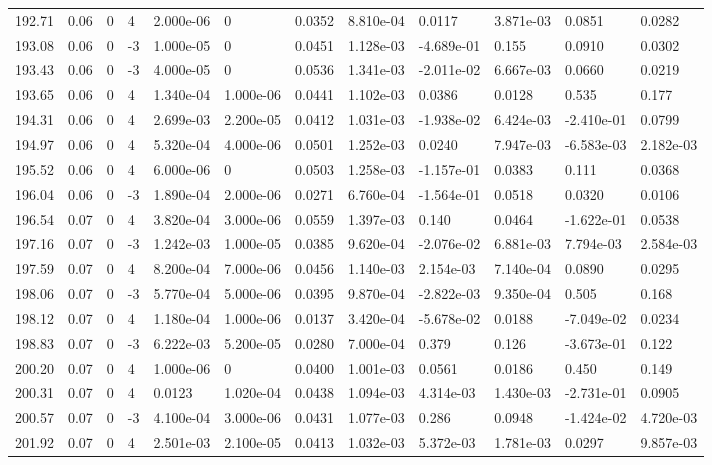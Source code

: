 \documentclass[preview]{standalone}
\begin{document}
{{{{{{{{{{\begin{tabular}{L{1.2cm}C{1.2cm} C{0.3cm}C{0.5cm} C{1.4cm}C{1.4cm} C{1.4cm}C{1.4cm} C{1.6cm}C{1.6cm} C{1.6cm}C{1.6cm}}
  192.71  &  0.06  & 0     &  4 &  2.000e-06  & 0  &  0.0352&   8.810e-04& 0.0117 & 3.871e-03   &  0.0851 & 0.0282  \\ 
  193.08  &  0.06  & 0     & -3 &  1.000e-05  & 0  &  0.0451&   1.128e-03& -4.689e-01 & 0.155   &  0.0910 & 0.0302  \\ 
  193.43  &  0.06  & 0     & -3 &  4.000e-05  & 0  &  0.0536&   1.341e-03& -2.011e-02 & 6.667e-03   &  0.0660 & 0.0219  \\ 
  193.65  &  0.06  & 0     &  4 &  1.340e-04  & 1.000e-06  &  0.0441&   1.102e-03& 0.0386 & 0.0128   &  0.535 & 0.177  \\ 
  194.31  &  0.06  & 0     &  4 &  2.699e-03  & 2.200e-05  &  0.0412&   1.031e-03& -1.938e-02 & 6.424e-03   &  -2.410e-01 & 0.0799  \\ 
  194.97  &  0.06  & 0     &  4 &  5.320e-04  & 4.000e-06  &  0.0501&   1.252e-03& 0.0240 & 7.947e-03   &  -6.583e-03 & 2.182e-03  \\ 
  195.52  &  0.06  & 0     &  4 &  6.000e-06  & 0  &  0.0503&   1.258e-03& -1.157e-01 & 0.0383   &  0.111 & 0.0368  \\ 
  196.04  &  0.06  & 0     & -3 &  1.890e-04  & 2.000e-06  &  0.0271&   6.760e-04& -1.564e-01 & 0.0518   &  0.0320 & 0.0106  \\ 
  196.54  &  0.07  & 0     &  4 &  3.820e-04  & 3.000e-06  &  0.0559&   1.397e-03& 0.140 & 0.0464   &  -1.622e-01 & 0.0538  \\ 
  197.16  &  0.07  & 0     & -3 &  1.242e-03  & 1.000e-05  &  0.0385&   9.620e-04& -2.076e-02 & 6.881e-03   &  7.794e-03 & 2.584e-03  \\ 
  197.59  &  0.07  & 0     &  4 &  8.200e-04  & 7.000e-06  &  0.0456&   1.140e-03& 2.154e-03 & 7.140e-04   &  0.0890 & 0.0295  \\ 
  198.06  &  0.07  & 0     & -3 &  5.770e-04  & 5.000e-06  &  0.0395&   9.870e-04& -2.822e-03 & 9.350e-04   &  0.505 & 0.168  \\ 
  198.12  &  0.07  & 0     &  4 &  1.180e-04  & 1.000e-06  &  0.0137&   3.420e-04& -5.678e-02 & 0.0188   &  -7.049e-02 & 0.0234  \\ 
  198.83  &  0.07  & 0     & -3 &  6.222e-03  & 5.200e-05  &  0.0280&   7.000e-04& 0.379 & 0.126   &  -3.673e-01 & 0.122  \\ 
  200.20  &  0.07  & 0     &  4 &  1.000e-06  & 0  &  0.0400&   1.001e-03& 0.0561 & 0.0186   &  0.450 & 0.149  \\ 
  200.31  &  0.07  & 0     &  4 &  0.0123  & 1.020e-04  &  0.0438&   1.094e-03& 4.314e-03 & 1.430e-03   &  -2.731e-01 & 0.0905  \\ 
  200.57  &  0.07  & 0     & -3 &  4.100e-04  & 3.000e-06  &  0.0431&   1.077e-03& 0.286 & 0.0948   &  -1.424e-02 & 4.720e-03  \\ 
  201.92  &  0.07  & 0     &  4 &  2.501e-03  & 2.100e-05  &  0.0413&   1.032e-03& 5.372e-03 & 1.781e-03   &  0.0297 & 9.857e-03  \\ 
\hline 
\end{tabular} 

}}}}}}}}}}
\end{document}
